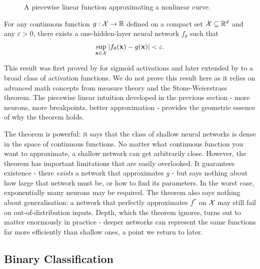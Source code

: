\begin{figure}
    \centering
    \resizebox{0.28\textwidth}{!}{}
    \caption{A piecewise linear function approximating a nonlinear curve.}
    \label{fig:piecewise_approx}
\end{figure}
\begin{theorem}
For any continuous function $g: \mathcal{X} \to \mathbb{R}$ defined on a compact set $\mathcal{X} \subseteq \mathbb{R}^d$ and any $\varepsilon > 0$, there exists a one-hidden-layer neural network $f_\theta$ such that
\begin{equation}
\sup_{\mathbf{x} \in \mathcal{X}} |f_\theta(\mathbf{x}) - g(\mathbf{x})| < \varepsilon.
\end{equation}
\end{theorem}
This result was first proved by \cite{cybenko1989approximation} for sigmoid activations and later extended by \cite{hornik1991approximation} to a broad class of activation functions. 
We do not prove this result here as it relies on advanced math concepts from measure theory and the Stone-Weierstrass theorem. The piecewise linear intuition developed in the previous section - more neurons, more breakpoints, better approximation - provides the geometric essence of why the theorem holds.

The theorem is powerful: it says that the class of shallow neural networks is dense in the space of continuous functions. No matter what continuous function you want to approximate, a shallow network can get arbitrarily close.
However, the theorem has important limitations that are easily overlooked. It guarantees existence - there \textit{exists} a network that approximates $g$ - but says nothing about how large that network must be, or how to find its parameters. In the worst case, exponentially many neurons may be required. The theorem also says nothing about generalisation: a network that perfectly approximates $f^*$ on $\mathcal{X}$ may still fail on out-of-distribution inputs. Depth, which the theorem ignores, turns out to matter enormously in practice - deeper networks can represent the same functions far more efficiently than shallow ones, a point we return to later.

\subsection{Binary Classification}

